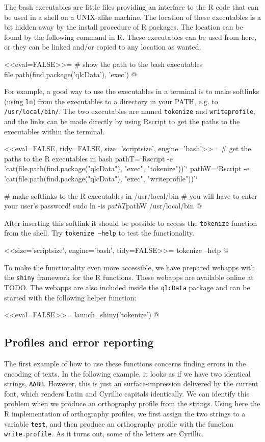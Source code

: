 The bash executables are little files providing an interface to the R code that
can be used in a shell on a UNIX-alike machine. The location of these
executables is a bit hidden away by the install procedure of R packages. The
location can be found by the following command in R. These executables can be 
used from here, or they can be linked and/or copied to any location as wanted.

<<eval=FALSE>>=
# show the path to the bash executables
file.path(find.package('qlcData'), 'exec')
@

For example, a good way to use the executables in a terminal is to
make softlinks (using \texttt{ln}) from the executables to a directory in your
PATH, e.g. to \texttt{/usr/local/bin/}. The two executables are named
\texttt{tokenize} and \texttt{writeprofile}, and the links can be made directly 
by using Rscript to get the paths to the executables within the terminal.

<<eval=FALSE, tidy=FALSE, size='scriptsize', engine='bash'>>=
# get the paths to the R executables in bash
pathT=`Rscript -e 'cat(file.path(find.package("qlcData"), "exec", "tokenize"))'`
pathW=`Rscript -e 'cat(file.path(find.package("qlcData"), "exec", "writeprofile"))'`

# make softlinks to the R executables in /usr/local/bin
# you will have to enter your user's password!
sudo ln -is $pathT $pathW /usr/local/bin
@

After inserting this softlink it should be possible to access the
\texttt{tokenize} function from the shell. Try \texttt{tokenize --help} to test
the functionality.

<<size='scriptsize', engine='bash', tidy=FALSE>>=
tokenize --help
@

To make the functionality even more accessible, we have prepared webapps with 
the \texttt{shiny} framework for the R functions. These webapps are available 
online at \url{TODO}. The webapps are also included inside the \texttt{qlcData} 
package and can be started with the following helper function:

<<eval=FALSE>>=
launch_shiny('tokenize')
@


\subsection*{Profiles and error reporting}
\label{error-reporting}

The first example of how to use these functions concerns finding errors in the
encoding of texts. In the following example, it looks as if we have two
identical strings, \texttt{AABB}. However, this is just an surface-impression
delivered by the current font, which renders Latin and Cyrillic capitals
identically. We can identify this problem when we produce an orthography profile
from the strings. Using here the R implementation of orthography profiles, we
first assign the two strings to a variable \texttt{test}, and then produce an
orthography profile with the function \texttt{write.profile}. As it turns out,
some of the letters are Cyrillic.

